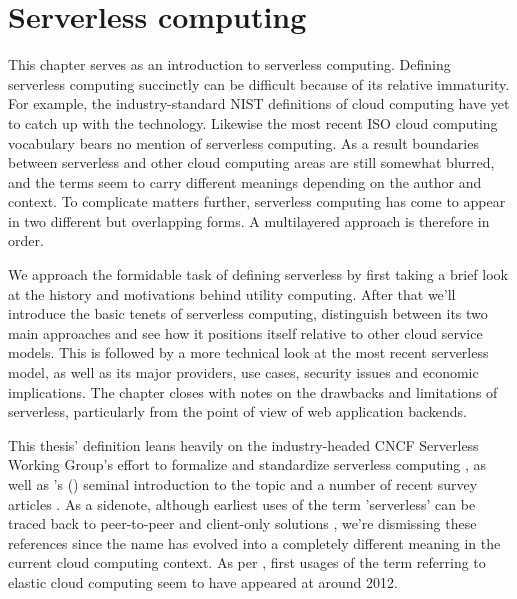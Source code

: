 \chapter{Serverless computing} \label{cha:serverless}

This chapter serves as an introduction to serverless computing. Defining serverless computing succinctly can be difficult because of its relative immaturity. For example, the industry-standard NIST definitions of cloud computing \parencite{nist11definitions} have yet to catch up with the technology. Likewise the most recent ISO cloud computing vocabulary \parencite{iso14vocabulary} bears no mention of serverless computing. As a result boundaries between serverless and other cloud computing areas are still somewhat blurred, and the terms seem to carry different meanings depending on the author and context. To complicate matters further, serverless computing has come to appear in two different but overlapping forms. A multilayered approach is therefore in order.

We approach the formidable task of defining serverless by first taking a brief look at the history and motivations behind utility computing. After that we'll introduce the basic tenets of serverless computing, distinguish between its two main approaches and see how it positions itself relative to other cloud service models. This is followed by a more technical look at the most recent serverless model, as well as its major providers, use cases, security issues and economic implications. The chapter closes with notes on the drawbacks and limitations of serverless, particularly from the point of view of web application backends.

This thesis' definition leans heavily on the industry-headed CNCF Serverless Working Group's effort to formalize and standardize serverless computing \parencite{cncf18serverlessWG}, as well as \citeauthor{robert2016serverlessarchitectures}'s (\citeyear{robert2016serverlessarchitectures}) seminal introduction to the topic and a number of recent survey articles \parencite{baldini17currentTrends,van2017spec,fox17}. As a sidenote, although earliest uses of the term 'serverless' can be traced back to peer-to-peer and client-only solutions \parencite{fox17}, we're dismissing these references since the name has evolved into a completely different meaning in the current cloud computing context. As per \textcite{robert2016serverlessarchitectures}, first usages of the term referring to elastic cloud computing seem to have appeared at around 2012.

